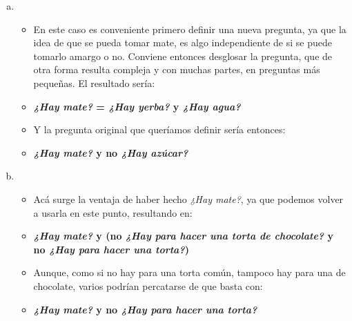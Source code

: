 \begin{solution}
\begin{enumerate}[a)]
        \item
            \begin{itemize}[label=, leftmargin=0mm,itemsep=8pt]
                \item En este caso es conveniente primero definir una nueva
                pregunta, ya que la idea de que se pueda tomar mate, es algo
                independiente de si se puede tomarlo amargo o no. Conviene entonces
                desglosar la pregunta, que de otra forma resulta compleja y con
                muchas partes, en preguntas más pequeñas. El resultado sería:
                \item \textbf{\textit{¿Hay mate?} = \textit{¿Hay yerba?} y
                \textit{¿Hay agua?}}
                \item Y la pregunta original que queríamos definir sería entonces:
                \item \textbf{\textit{¿Hay mate?} y no \textit{¿Hay azúcar?}}
            \end{itemize}

        \item
            \begin{itemize}[label=, leftmargin=0mm,itemsep=8pt]
                \item Acá surge la ventaja de haber hecho \textit{¿Hay mate?}, ya
                que podemos volver a usarla en este punto, resultando en:
                \item \textbf{\textit{¿Hay mate?} y (no \textit{¿Hay para hacer una
                torta de chocolate?} y no \textit{¿Hay para hacer una torta?})}
                \item Aunque, como si no hay para una torta común, tampoco hay para
                una de chocolate, varios podrían percatarse de que basta con:
                \item \textbf{\textit{¿Hay mate?} y no \textit{¿Hay para hacer una
                torta?}}
        \end{itemize}
    \end{enumerate}
\end{solution}

